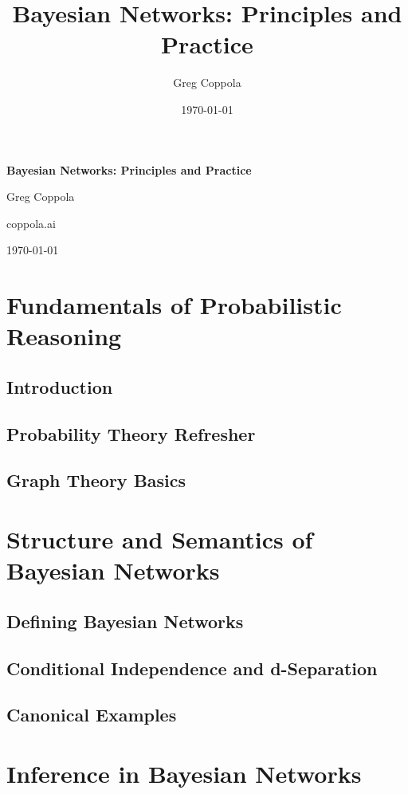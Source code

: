 \documentclass[12pt]{book}
\title{Bayesian Networks: Principles and Practice}
\author{Greg Coppola}
\date{\today}
\newcommand{\publisher}{coppola.ai}
\begin{document}
\begin{titlepage}
    \centering
    {\Huge \bfseries Bayesian Networks: Principles and Practice \par}
    \vspace{1.5cm}
    {\Large Greg Coppola \par}
    \vspace{2cm}
    {\large \publisher \par}
    \vfill
    {\large \today \par}
\end{titlepage}

\frontmatter
\tableofcontents

\mainmatter

\part{Fundamentals of Probabilistic Reasoning}
\chapter{Introduction}
\chapter{Probability Theory Refresher}
\chapter{Graph Theory Basics}

\part{Structure and Semantics of Bayesian Networks}
\chapter{Defining Bayesian Networks}
\chapter{Conditional Independence and d-Separation}
\chapter{Canonical Examples}

\part{Inference in Bayesian Networks}
\end{document}
